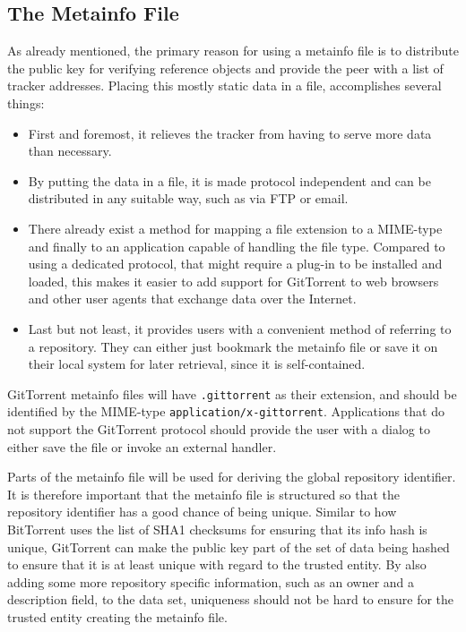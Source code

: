 \subsection{The Metainfo File}
\label{sec:metainfo}

As already mentioned, the primary reason for using a metainfo file is
to distribute the public key for verifying reference objects and
provide the peer with a list of tracker addresses. Placing this mostly
static data in a file, accomplishes several things:

\begin{itemize}

\item
%
	First and foremost, it relieves the tracker from having to
	serve more data than necessary. 

\item
%
	By putting the data in a file, it is made protocol independent
	and can be distributed in any suitable way, such as via FTP or
	email.

\item
%
	There already exist a method for mapping a file extension to a
	MIME-type and finally to an application capable of handling
	the file type. Compared to using a dedicated protocol, that
	might require a plug-in to be installed and loaded, this makes
	it easier to add support for GitTorrent to web browsers and
	other user agents that exchange data over the Internet.

\item
%
	Last but not least, it provides users with a convenient method
	of referring to a repository. They can either just bookmark the
	metainfo file or save it on their local system for later
	retrieval, since it is self-contained.

\end{itemize}

GitTorrent metainfo files will have \texttt{.gittorrent} as their
extension, and should be identified by the MIME-type
\texttt{application/x-gittorrent}. Applications that do not support
the GitTorrent protocol should provide the user with a dialog to
either save the file or invoke an external handler.

Parts of the metainfo file will be used for deriving the global
repository identifier. It is therefore important that the metainfo
file is structured so that the repository identifier has a good chance
of being unique. Similar to how BitTorrent uses the list of SHA1
checksums for ensuring that its info hash is unique, GitTorrent can
make the public key part of the set of data being hashed to ensure
that it is at least unique with regard to the trusted entity.  By also
adding some more repository specific information, such as an owner and
a description field, to the data set, uniqueness should not be hard to
ensure for the trusted entity creating the metainfo file.

